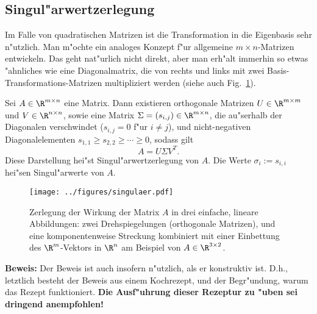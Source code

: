 \begin{auf}\cha\label{block1A6b}

\end{auf}

\subsection{Singul"arwertzerlegung}
Im Falle von quadratischen Matrizen ist die Transformation in die Eigenbasis 
sehr n"utzlich. Man m"ochte ein analoges Konzept f"ur allgemeine $m\times n$-Matrizen 
entwickeln. Das geht nat"urlich nicht direkt, aber man erh"alt immerhin so etwas 
"ahnliches wie eine Diagonalmatrix, die von rechts und links mit zwei 
Basis-Transformations-Matrizen multipliziert werden (siehe auch Fig.~\ref{singAbb1}).\par\bigskip

\begin{ssatz} Sei $A\in \R^{m\times n}$ eine Matrix. Dann existieren orthogonale 
Matrizen $U\in \R^{m\times m}$ und $V\in\R^{n\times n}$, sowie eine Matrix 
$\Sigma=(s_{i,j})\in \R^{m\times n}$,
die au"serhalb der Diagonalen verschwindet ($s_{i,j}=0$ f"ur $i\not = j$), und 
nicht-negativen Diagonalelementen $s_{1,1}\geq s_{2,2}\geq\cdots\geq 0$, sodass 
gilt 
$$ A = U \Sigma V^T.$$
Diese Darstellung hei"st Singul"arwertzerlegung von $A$. Die Werte $\sigma_i := s_{i,i}$
hei"sen Singul"arwerte von $A$.
\end{ssatz}

\begin{figure}[htb]
\begin{center}
\texttt{[image: ../figures/singulaer.pdf]}
\end{center}
\caption{Zerlegung der Wirkung der Matrix $A$ in drei einfache, lineare
Abbildungen: zwei Drehspiegelungen (orthogonale Matrizen), und eine komponentenweise Streckung kombiniert mit einer  
Einbettung des $\R^m$-Vektors in $\R^n$ am Beispiel von $A\in\R^{3\times 2}$.}
\label{singAbb1}
\end{figure}

{\bf Beweis: } Der Beweis ist auch insofern n"utzlich, als er konstruktiv ist. 
D.h., letztlich besteht der Beweis aus einem Kochrezept, und der Begr"undung, 
warum das Rezept funktioniert. 
{\bf Die Ausf"uhrung dieser Rezeptur zu "uben sei dringend anempfohlen!}

